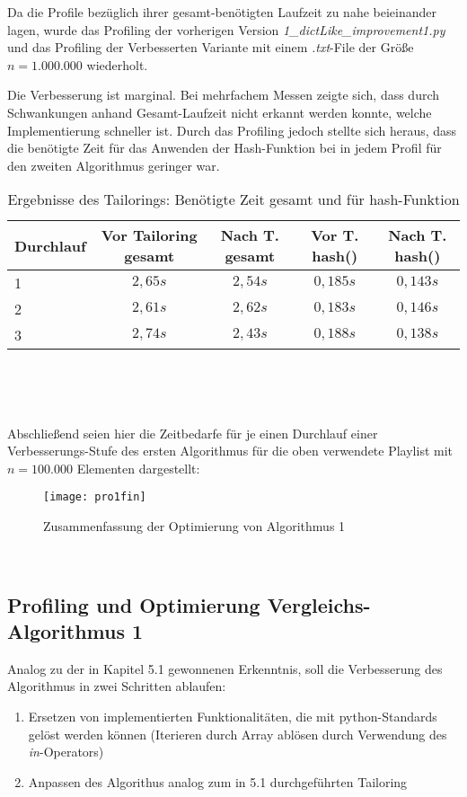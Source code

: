 \documentclass[
10pt, %
a4paper, %
oneside, %
headinclude,footinclude, %
BCOR5mm, %
]{scrartcl}
\begin{document}
Da die Profile bezüglich ihrer gesamt-benötigten Laufzeit zu nahe beieinander lagen, wurde das Profiling der vorherigen Version \textit{1\_dictLike\_improvement1.py} und das Profiling der Verbesserten Variante mit einem \textit{.txt}-File der Größe \(n=1.000.000\) wiederholt.

Die Verbesserung ist marginal. Bei mehrfachem Messen zeigte sich, dass durch Schwankungen anhand Gesamt-Laufzeit nicht erkannt werden konnte, welche Implementierung schneller ist. Durch das Profiling jedoch stellte sich heraus, dass die benötigte Zeit für das Anwenden der Hash-Funktion bei in jedem Profil für den zweiten Algorithmus geringer war.


\begin{table}[h!]
	\centering 
	\begin{tabular}{l|c|c|c|c|}
		\hline 
		Durchlauf & Vor Tailoring gesamt & Nach T. gesamt & Vor T. hash() & Nach T. hash()\\ 
		\hline
		1	& \(2,65s\)	& \(2,54s\)	& \(0,185s\) & \(0,143s\) \\
		\hline
		2	& \(2,61s\)	& \(2,62s\)	& \(0,183s\) & \(0,146s\) \\
		\hline
		3	& \(2,74s\)	& \(2,43s\)	& \(0,188s\) & \(0,138s\) \\
		\hline
	\end{tabular}\\
	\caption[Ergebnisse Tailoring]{Ergebnisse des Tailorings: Benötigte Zeit gesamt und für hash-Funktion}
\end{table}\

Abschließend seien hier die Zeitbedarfe für je einen Durchlauf einer Verbesserungs-Stufe des ersten Algorithmus für die oben verwendete Playlist mit \(n=100.000\) Elementen dargestellt:

\begin{figure}[h!]
	\centering 
	\texttt{[image: pro1fin]} 
	\caption[Zusammenfassung Optimierung Alg. 1]{Zusammenfassung der Optimierung von Algorithmus 1}
\end{figure}\

\subsection{Profiling und Optimierung Vergleichs-Algorithmus 1}
Analog zu der in Kapitel 5.1 gewonnenen Erkenntnis, soll die Verbesserung des Algorithmus in zwei Schritten ablaufen:
\begin{enumerate}[noitemsep]
	\item Ersetzen von implementierten Funktionalitäten, die mit python-Standards gelöst werden können (Iterieren durch Array ablösen durch Verwendung des \textit{in}-Operators)
	\item Anpassen des Algorithus analog zum in 5.1 durchgeführten Tailoring
\end{enumerate}\
\end{document}
